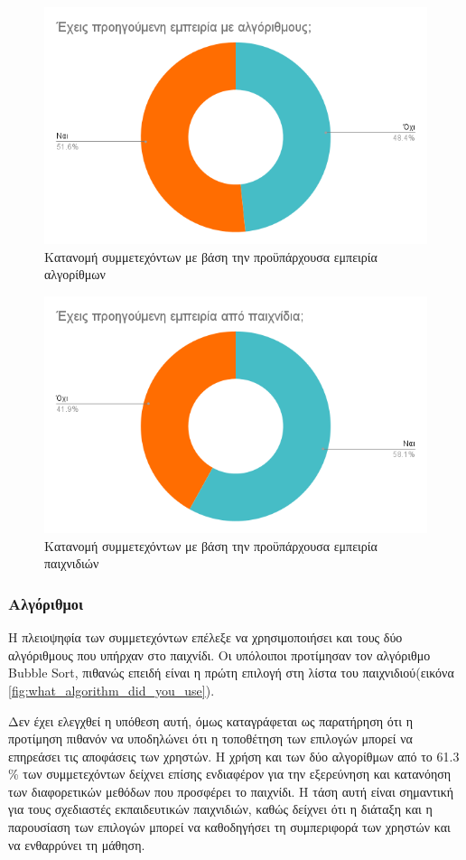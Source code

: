 \begin{figure}[H]
    \centering
    \includegraphics[width=0.7\linewidth]{sections/5/2/images/do_you_have_previous_experience_of_algorithms}
    \caption{Κατανομή συμμετεχόντων με βάση την προϋπάρχουσα εμπειρία αλγορίθμων}
    \label{fig:do_you_have_previous_experience_of_algorithms}
\end{figure}

\begin{figure}[H]
    \centering
    \includegraphics[width=0.7\linewidth]{sections/5/2/images/do_you_have_previous_gaming_experience}
    \caption{Κατανομή συμμετεχόντων με βάση την προϋπάρχουσα εμπειρία παιχνιδιών}
    \label{fig:do_you_have_previous_gaming_experience}
\end{figure}


\subsubsection{Αλγόριθμοι}

Η πλειοψηφία των συμμετεχόντων επέλεξε να χρησιμοποιήσει και τους δύο αλγόριθμους που υπήρχαν στο παιχνίδι. Οι υπόλοιποι προτίμησαν τον αλγόριθμο Bubble Sort, πιθανώς επειδή είναι η πρώτη επιλογή στη λίστα του παιχνιδιού(εικόνα \ref{fig:what_algorithm_did_you_use}).

Δεν έχει ελεγχθεί η υπόθεση αυτή, όμως καταγράφεται ως παρατήρηση ότι η προτίμηση πιθανόν να υποδηλώνει ότι η τοποθέτηση των επιλογών μπορεί να επηρεάσει τις αποφάσεις των χρηστών. Η χρήση και των δύο αλγορίθμων από το 61.3 \% των συμμετεχόντων δείχνει επίσης ενδιαφέρον για την εξερεύνηση και κατανόηση των διαφορετικών μεθόδων που προσφέρει το παιχνίδι. Η τάση αυτή είναι σημαντική για τους σχεδιαστές εκπαιδευτικών παιχνιδιών, καθώς δείχνει ότι η διάταξη και η παρουσίαση των επιλογών μπορεί να καθοδηγήσει τη συμπεριφορά των χρηστών και να ενθαρρύνει τη μάθηση.

